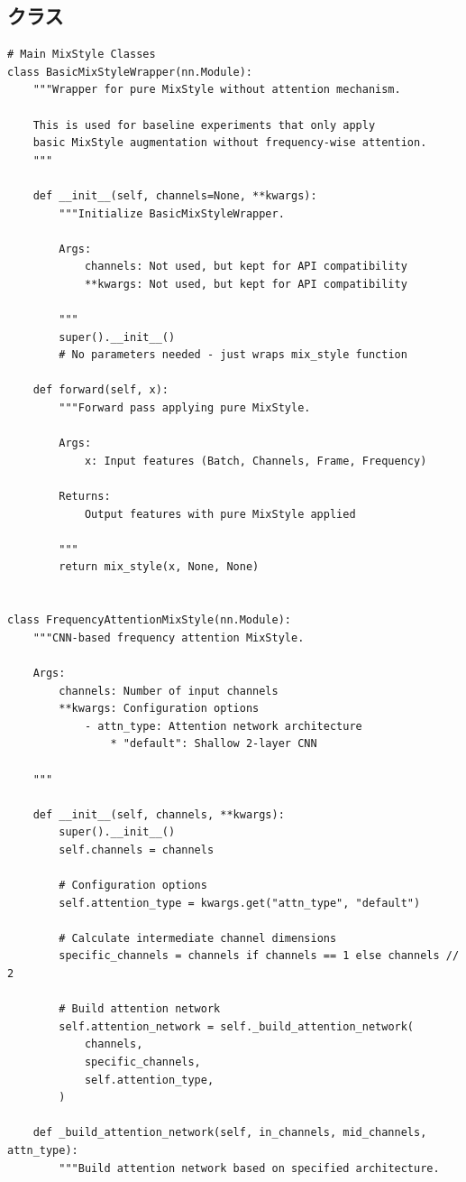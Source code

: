 \documentclass[../main.tex]{subfiles}
\begin{document}
\subsection{クラス}
\begin{verbatim}
# Main MixStyle Classes
class BasicMixStyleWrapper(nn.Module):
    """Wrapper for pure MixStyle without attention mechanism.

    This is used for baseline experiments that only apply
    basic MixStyle augmentation without frequency-wise attention.
    """

    def __init__(self, channels=None, **kwargs):
        """Initialize BasicMixStyleWrapper.

        Args:
            channels: Not used, but kept for API compatibility
            **kwargs: Not used, but kept for API compatibility

        """
        super().__init__()
        # No parameters needed - just wraps mix_style function

    def forward(self, x):
        """Forward pass applying pure MixStyle.

        Args:
            x: Input features (Batch, Channels, Frame, Frequency)

        Returns:
            Output features with pure MixStyle applied

        """
        return mix_style(x, None, None)


class FrequencyAttentionMixStyle(nn.Module):
    """CNN-based frequency attention MixStyle.

    Args:
        channels: Number of input channels
        **kwargs: Configuration options
            - attn_type: Attention network architecture
                * "default": Shallow 2-layer CNN

    """

    def __init__(self, channels, **kwargs):
        super().__init__()
        self.channels = channels

        # Configuration options
        self.attention_type = kwargs.get("attn_type", "default")

        # Calculate intermediate channel dimensions
        specific_channels = channels if channels == 1 else channels // 2

        # Build attention network
        self.attention_network = self._build_attention_network(
            channels,
            specific_channels,
            self.attention_type,
        )

    def _build_attention_network(self, in_channels, mid_channels, attn_type):
        """Build attention network based on specified architecture.


\end{verbatim}
\end{document}
